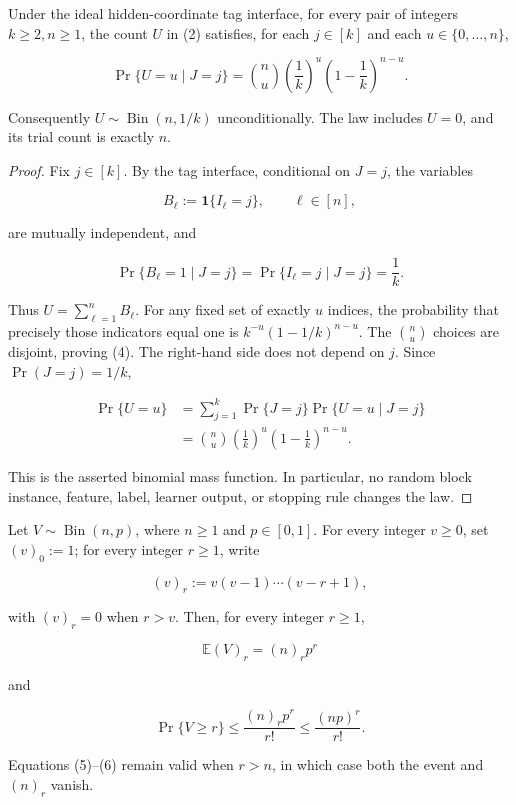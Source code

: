 \begin{lemma}\label{lem:step-009-usage-law}
Under the ideal hidden-coordinate tag interface, for every pair of
integers \(k\ge2,n\ge1\), the count \(U\) in (2) satisfies, for each
\(j\in[k]\) and each \(u\in\{0,\ldots,n\}\),

\[
\Pr\{U=u\mid J=j\}
=\binom nu\left(\frac1k\right)^u
 \left(1-\frac1k\right)^{n-u}.
\tag{4}
\]

Consequently \(U\sim\operatorname{Bin}(n,1/k)\) unconditionally. The law
includes \(U=0\), and its trial count is exactly \(n\).
\end{lemma}

\begin{proof}
Fix \(j\in[k]\). By the tag interface, conditional on \(J=j\),
the variables

\[
B_\ell:=\mathbf1\{I_\ell=j\},\qquad \ell\in[n],
\]

are mutually independent, and

\[
\Pr\{B_\ell=1\mid J=j\}=\Pr\{I_\ell=j\mid J=j\}=\frac1k.
\]

Thus \(U=\sum_{\ell=1}^nB_\ell\). For any fixed set of exactly \(u\)
indices, the probability that precisely those indicators equal one is
\(k^{-u}(1-1/k)^{n-u}\). The \(\binom nu\) choices are disjoint, proving
(4). The right-hand side does not depend on \(j\). Since
\(\Pr(J=j)=1/k\),

\[
\begin{aligned}
\Pr\{U=u\}
&=\sum_{j=1}^k\Pr\{J=j\}\Pr\{U=u\mid J=j\}\\
&=\binom nu\left(\frac1k\right)^u
 \left(1-\frac1k\right)^{n-u}.
\end{aligned}
\]

This is the asserted binomial mass function. In particular, no random block
instance, feature, label, learner output, or stopping rule changes the law.
\end{proof}

\begin{lemma}\label{lem:step-009-factorial-tail}
Let \(V\sim\operatorname{Bin}(n,p)\), where \(n\ge1\) and
\(p\in[0,1]\). For every integer \(v\ge0\), set \((v)_0:=1\); for every
integer \(r\ge1\), write

\[
(v)_r:=v(v-1)\cdots(v-r+1),
\]

with \((v)_r=0\) when \(r>v\). Then, for every integer \(r\ge1\),

\[
\mathbb E(V)_r=(n)_r p^r
\tag{5}
\]

and

\[
\Pr\{V\ge r\}
\le \frac{(n)_r p^r}{r!}
\le \frac{(np)^r}{r!}.
\tag{6}
\]

Equations (5)--(6) remain valid when \(r>n\), in which case both the event
and \((n)_r\) vanish.
\end{lemma}

